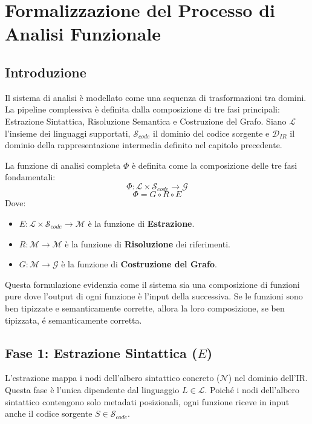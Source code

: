 \chapter{Formalizzazione del Processo di Analisi Funzionale}
\section{Introduzione}
Il sistema di analisi è modellato come una sequenza di trasformazioni
tra domini. La pipeline complessiva è definita dalla composizione di
tre fasi principali: Estrazione Sintattica, Risoluzione Semantica e
Costruzione del Grafo.
Siano $\mathcal{L}$ l'insieme dei linguaggi supportati,
$\mathcal{S}_{code}$ il dominio del codice sorgente e
$\mathcal{D}_{IR}$ il dominio della rappresentazione intermedia
definito nel capitolo precedente.

La funzione di analisi completa $\Phi$ è definita come la
composizione delle tre fasi fondamentali:
$$\Phi : \mathcal{L} \times \mathcal{S}_{code} \to \mathcal{G}$$
$$\Phi = G \circ R \circ E$$
Dove:
\begin{itemize}
  \item $E : \mathcal{L} \times \mathcal{S}_{code} \to \mathcal{M}$ è
    la funzione di \textbf{Estrazione}.
  \item $R : \mathcal{M} \to \mathcal{M}$ è la funzione di
    \textbf{Risoluzione} dei riferimenti.
  \item $G : \mathcal{M} \to \mathcal{G}$ è la funzione di
    \textbf{Costruzione del Grafo}.
\end{itemize}
Questa formulazione evidenzia come il sistema sia una composizione di
funzioni pure dove l'output di ogni funzione è l'input della
successiva. Se le funzioni sono ben tipizzate e semanticamente
corrette, allora la loro composizione, se ben tipizzata, é
semanticamente corretta.

\section{Fase 1: Estrazione Sintattica ($E$)}
L'estrazione mappa i nodi dell'albero sintattico concreto
($\mathcal{N}$) nel dominio dell'IR. Questa fase è l'unica dipendente
dal linguaggio $L \in \mathcal{L}$. Poiché i nodi dell'albero
sintattico contengono solo metadati posizionali, ogni funzione riceve
in input anche il codice sorgente $S \in \mathcal{S}_{code}$.

